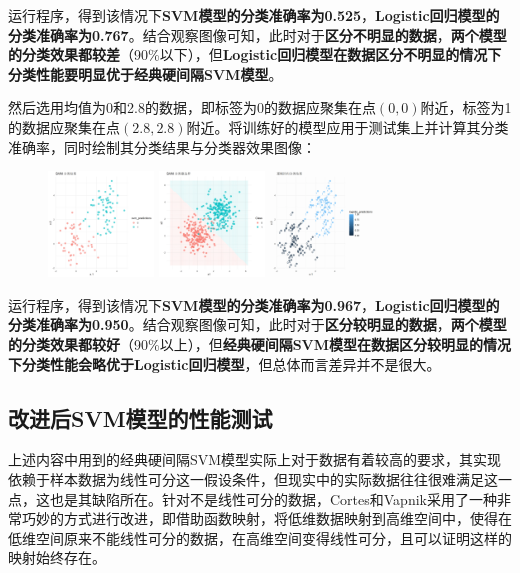 \documentclass[12pt]{article}  %
\begin{document}
运行程序，得到该情况下\textbf{SVM模型的分类准确率为0.525}，\textbf{Logistic回归模型的分类准确率为0.767}。结合观察图像可知，此时对于\textbf{区分不明显的数据}，\textbf{两个模型的分类效果都较差}（90\%以下），但\textbf{Logistic回归模型在数据区分不明显的情况下分类性能要明显优于经典硬间隔SVM模型}。

然后选用均值为0和2.8的数据，即标签为0的数据应聚集在点$(0,0)$附近，标签为1的数据应聚集在点$(2.8,2.8)$附近。将训练好的模型应用于测试集上并计算其分类准确率，同时绘制其分类结果与分类器效果图像：

\begin{figure}[H]
	\centering
	\includegraphics[width=0.25\textwidth]{8.png}
	\includegraphics[width=0.25\textwidth]{9.png}
	\includegraphics[width=0.25\textwidth]{10.png}
\end{figure}

运行程序，得到该情况下\textbf{SVM模型的分类准确率为0.967}，\textbf{Logistic回归模型的分类准确率为0.950}。结合观察图像可知，此时对于\textbf{区分较明显的数据}，\textbf{两个模型的分类效果都较好}（90\%以上），但\textbf{经典硬间隔SVM模型在数据区分较明显的情况下分类性能会略优于Logistic回归模型}，但总体而言差异并不是很大。

\subsection{改进后SVM模型的性能测试}

上述内容中用到的经典硬间隔SVM模型实际上对于数据有着较高的要求，其实现依赖于样本数据为线性可分这一假设条件，但现实中的实际数据往往很难满足这一点，这也是其缺陷所在。针对不是线性可分的数据，Cortes和Vapnik采用了一种非常巧妙的方式进行改进，即借助函数映射，将低维数据映射到高维空间中，使得在低维空间原来不能线性可分的数据，在高维空间变得线性可分，且可以证明这样的映射始终存在。
\end{document}
